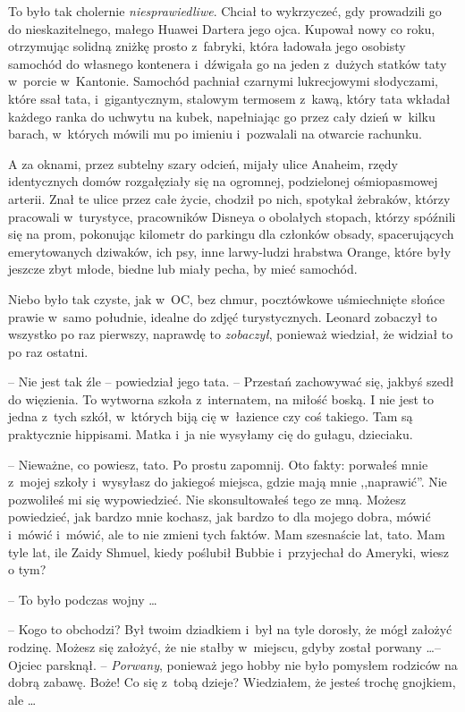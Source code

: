 \documentclass[oneside,polish,11pt,rmheadings]{mwbk}
\begin{document}
To było tak cholernie \textit{niesprawiedliwe}. Chciał to wykrzyczeć, gdy prowadzili go do nieskazitelnego, małego Huawei Dartera jego ojca. Kupował nowy co roku, otrzymując solidną zniżkę prosto z~fabryki, która ładowała jego osobisty samochód do własnego kontenera i~dźwigała go na jeden z~dużych statków taty w~porcie w~Kantonie. Samochód pachniał czarnymi lukrecjowymi słodyczami, które ssał tata, i~gigantycznym, stalowym termosem z~kawą, który tata wkładał każdego ranka do uchwytu na kubek, napełniając go przez cały dzień w~kilku barach, w~których mówili mu po imieniu i~pozwalali na otwarcie rachunku. 


A za oknami, przez subtelny szary odcień, mijały ulice Anaheim, rzędy identycznych domów rozgałęziały się na ogromnej, podzielonej ośmiopasmowej arterii. Znał te ulice przez całe życie, chodził po nich, spotykał żebraków, którzy pracowali w~turystyce, pracowników Disneya o obolałych stopach, którzy spóźnili się na prom, pokonując kilometr do parkingu dla członków obsady, spacerujących emerytowanych dziwaków, ich psy, inne larwy-ludzi hrabstwa Orange, które były jeszcze zbyt młode, biedne lub miały pecha, by mieć samochód. 


Niebo było tak czyste, jak w~OC, bez chmur, pocztówkowe uśmiechnięte słońce prawie w~samo południe, idealne do zdjęć turystycznych. Leonard zobaczył to wszystko po raz pierwszy, naprawdę to \textit{zobaczył}, ponieważ wiedział, że widział to po raz ostatni. 


-- Nie jest tak źle -- powiedział jego tata. -- Przestań zachowywać się, jakbyś szedł do więzienia. To wytworna szkoła z~internatem, na miłość boską. I nie jest to jedna z~tych szkół, w~których biją cię w~łazience czy coś takiego. Tam są praktycznie hippisami. Matka i~ja nie wysyłamy cię do gułagu, dzieciaku. 


-- Nieważne, co powiesz, tato. Po prostu zapomnij. Oto fakty: porwałeś mnie z~mojej szkoły i~wysyłasz do jakiegoś miejsca, gdzie mają mnie ,,naprawić''. Nie pozwoliłeś mi się wypowiedzieć. Nie skonsultowałeś tego ze mną. Możesz powiedzieć, jak bardzo mnie kochasz, jak bardzo to dla mojego dobra, mówić i~mówić i~mówić, ale to nie zmieni tych faktów. Mam szesnaście lat, tato. Mam tyle lat, ile Zaidy Shmuel, kiedy poślubił Bubbie i~przyjechał do Ameryki, wiesz o tym? 


-- To było podczas wojny \ldots  


-- Kogo to obchodzi? Był twoim dziadkiem i~był na tyle dorosły, że mógł założyć rodzinę. Możesz się założyć, że nie stałby w~miejscu, gdyby został porwany \ldots  -- Ojciec parsknął. -- \textit{Porwany}, ponieważ jego hobby nie było pomysłem rodziców na dobrą zabawę. Boże! Co się z~tobą dzieje? Wiedziałem, że jesteś trochę gnojkiem, ale \ldots  
\end{document}

